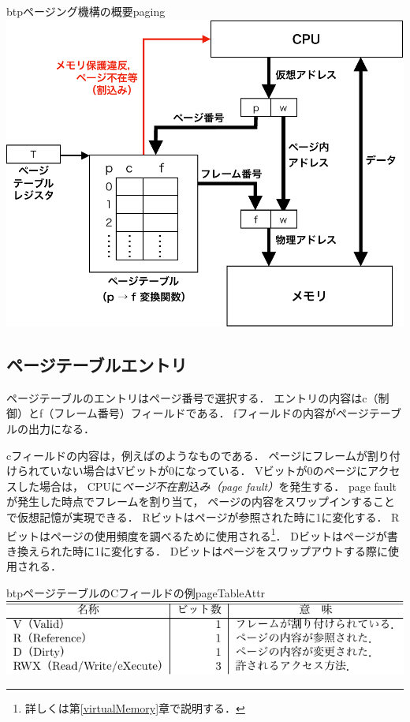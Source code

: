\begin{myfig}{btp}{ページング機構の概要}{paging}
  \includegraphics[scale=0.66]{Fig/paging-crop.pdf}
\end{myfig}

\subsection{ページテーブルエントリ}
ページテーブルのエントリはページ番号で選択する．
エントリの内容はc（制御）とf（フレーム番号）フィールドである．
fフィールドの内容がページテーブルの出力になる．

cフィールドの内容は，例えばのようなものである．
ページにフレームが割り付けられていない場合はVビットが0になっている．
Vビットが0のページにアクセスした場合は，
CPUに\emph{ページ不在割込み（page fault）}を発生する．
page fault が発生した時点でフレームを割り当て，
ページの内容をスワップインすることで仮想記憶が実現できる．
Rビットはページが参照された時に1に変化する．
Rビットはページの使用頻度を調べるために使用される\footnote{
  詳しくは第\ref{virtualMemory}章で説明する．}．
Dビットはページが書き換えられた時に1に変化する．
Dビットはページをスワップアウトする際に使用される．

\begin{mytable}{btp}{ページテーブルのCフィールドの例}{pageTableAttr}
  \includegraphics[scale=1.0]{Tbl/pageTableAttr.pdf}
\end{mytable}


